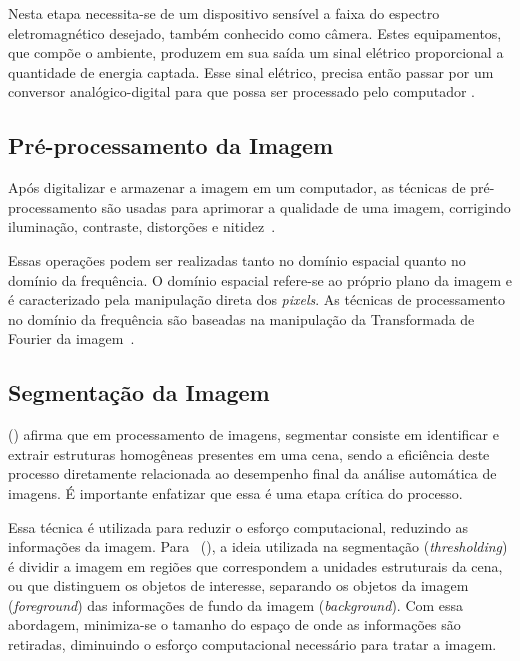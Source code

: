 Nesta etapa necessita-se de um dispositivo sensível a faixa do espectro eletromagnético desejado, também conhecido como câmera. Estes equipamentos, que compõe o ambiente, produzem em sua saída um sinal elétrico proporcional a quantidade de energia captada. Esse sinal elétrico, precisa então passar por um conversor analógico-digital para que possa ser processado pelo computador \cite{rogeralex1999}.

\subsection{Pré-processamento da Imagem}
\label{subsec:preProcImagem}

Após digitalizar e armazenar a imagem em um computador, as técnicas de pré-processamento são usadas para aprimorar a qualidade de uma imagem, corrigindo iluminação, contraste, distorções e nitidez~\cite{rudek2001visao}.

Essas operações podem ser realizadas tanto no domínio espacial quanto no domínio da frequência. O domínio espacial refere-se ao próprio plano da imagem e é caracterizado pela manipulação direta dos \textit{pixels}. As técnicas de processamento no domínio da frequência são baseadas na manipulação da Transformada de Fourier da imagem~\cite{rogeralex1999}.

\subsection{Segmentação da Imagem}
\label{subsec:segImagem}

\citeauthor{heinen2004navegaccao} (\citeyear{heinen2004navegaccao}) afirma que em processamento de imagens, segmentar consiste em identificar e extrair estruturas homogêneas presentes em uma cena, sendo a eficiência deste processo diretamente relacionada ao desempenho final da análise automática de imagens. É importante enfatizar que essa é uma etapa crítica do processo.

Essa técnica é utilizada para reduzir o esforço computacional, reduzindo as informações da imagem. Para~\citeauthor{rudek2001visao} (\citeyear{rudek2001visao}), a ideia utilizada na segmentação (\textit{thresholding}) é dividir a imagem em regiões que correspondem a unidades estruturais da cena, ou que distinguem os objetos de interesse, separando os objetos da imagem (\textit{foreground}) das informações de fundo da imagem (\textit{background}). Com essa abordagem, minimiza-se o tamanho do espaço de onde as informações são retiradas, diminuindo o esforço computacional necessário para tratar a imagem.

